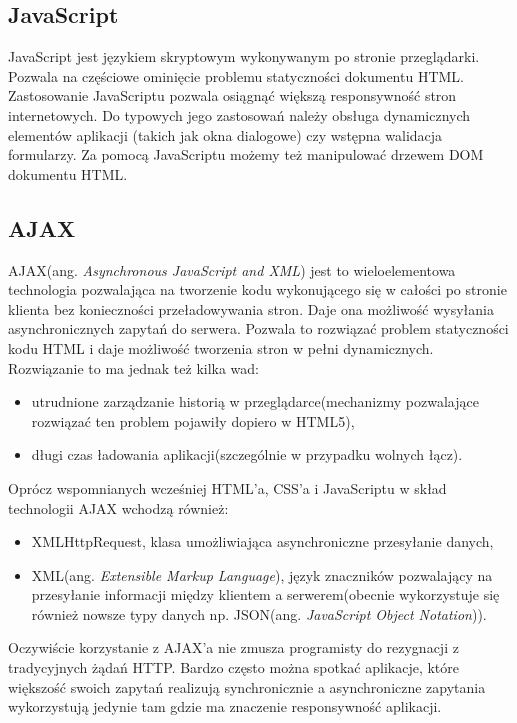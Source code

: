 \subsection[JavaScript][JavaScript]{JavaScript}
JavaScript jest językiem skryptowym wykonywanym po stronie przeglądarki. Pozwala na częściowe ominięcie problemu statyczności dokumentu HTML. Zastosowanie JavaScriptu pozwala osiągnąć większą responsywność stron internetowych. Do typowych jego zastosowań należy obsługa dynamicznych elementów aplikacji (takich jak okna dialogowe) czy wstępna walidacja formularzy. Za pomocą JavaScriptu możemy też manipulować drzewem DOM dokumentu HTML.

\subsection[AJAX][AJAX]{AJAX}
AJAX(ang. \textit{Asynchronous JavaScript and XML}) jest to wieloelementowa technologia pozwalająca na tworzenie kodu wykonującego się w całości po stronie klienta bez konieczności przeładowywania stron. Daje ona możliwość wysyłania asynchronicznych zapytań do serwera. Pozwala to rozwiązać problem statyczności kodu HTML i daje możliwość tworzenia stron w pełni dynamicznych. Rozwiązanie to ma jednak też kilka wad:
\begin{itemize}
	\item utrudnione zarządzanie historią w przeglądarce(mechanizmy pozwalające rozwiązać ten problem pojawiły dopiero w HTML5),
	\item długi czas ładowania aplikacji(szczególnie w przypadku wolnych łącz).
\end{itemize}
Oprócz wspomnianych wcześniej HTML'a, CSS'a i JavaScriptu w skład technologii AJAX wchodzą również:
\begin{itemize}
	\item XMLHttpRequest, klasa umożliwiająca asynchroniczne przesyłanie danych,
	\item XML(ang. \textit{Extensible Markup Language}), język znaczników pozwalający na przesyłanie informacji między klientem a serwerem(obecnie wykorzystuje się również nowsze typy danych np. JSON(ang. \textit{JavaScript Object Notation})).
\end{itemize}
Oczywiście korzystanie z AJAX'a nie zmusza programisty do rezygnacji z tradycyjnych żądań HTTP. Bardzo często można spotkać aplikacje, które większość swoich zapytań realizują synchronicznie a asynchroniczne zapytania wykorzystują jedynie tam gdzie ma znaczenie responsywność aplikacji.

